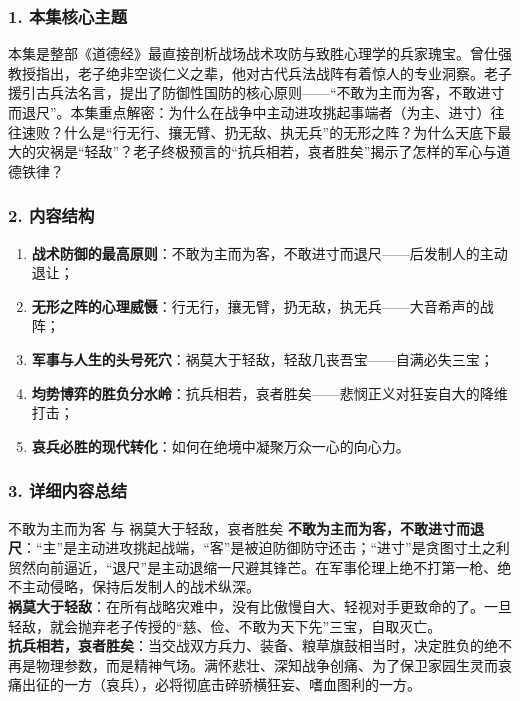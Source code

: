 \subsubsection{1. 本集核心主题}
本集是整部《道德经》最直接剖析战场战术攻防与致胜心理学的兵家瑰宝。曾仕强教授指出，老子绝非空谈仁义之辈，他对古代兵法战阵有着惊人的专业洞察。老子援引古兵法名言，提出了防御性国防的核心原则——“不敢为主而为客，不敢进寸而退尺”。本集重点解密：为什么在战争中主动进攻挑起事端者（为主、进寸）往往速败？什么是“行无行、攘无臂、扔无敌、执无兵”的无形之阵？为什么天底下最大的灾祸是“轻敌”？老子终极预言的“抗兵相若，哀者胜矣”揭示了怎样的军心与道德铁律？

\subsubsection{2. 内容结构}
\begin{enumerate}
    \item \textbf{战术防御的最高原则}：不敢为主而为客，不敢进寸而退尺——后发制人的主动退让；
    \item \textbf{无形之阵的心理威慑}：行无行，攘无臂，扔无敌，执无兵——大音希声的战阵；
    \item \textbf{军事与人生的头号死穴}：祸莫大于轻敌，轻敌几丧吾宝——自满必失三宝；
    \item \textbf{均势博弈的胜负分水岭}：抗兵相若，哀者胜矣——悲悯正义对狂妄自大的降维打击；
    \item \textbf{哀兵必胜的现代转化}：如何在绝境中凝聚万众一心的向心力。
\end{enumerate}

\subsubsection{3. 详细内容总结}

\begin{ConceptBox}{不敢为主而为客 与 祸莫大于轻敌，哀者胜矣}
\textbf{不敢为主而为客，不敢进寸而退尺}：“主”是主动进攻挑起战端，“客”是被迫防御防守还击；“进寸”是贪图寸土之利贸然向前逼近，“退尺”是主动退缩一尺避其锋芒。在军事伦理上绝不打第一枪、绝不主动侵略，保持后发制人的战术纵深。\\
\textbf{祸莫大于轻敌}：在所有战略灾难中，没有比傲慢自大、轻视对手更致命的了。一旦轻敌，就会抛弃老子传授的“慈、俭、不敢为天下先”三宝，自取灭亡。\\
\textbf{抗兵相若，哀者胜矣}：当交战双方兵力、装备、粮草旗鼓相当时，决定胜负的绝不再是物理参数，而是精神气场。满怀悲壮、深知战争创痛、为了保卫家园生灵而哀痛出征的一方（哀兵），必将彻底击碎骄横狂妄、嗜血图利的一方。
\end{ConceptBox}

